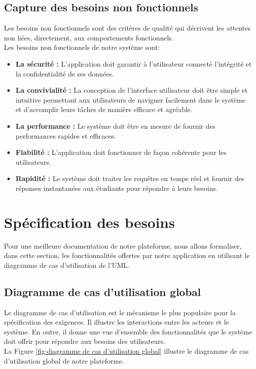 \subsection{Capture des besoins non fonctionnels}
Les besoins non fonctionnels sont des critères de qualité qui décrivent les attentes non liées, directement, aux  comportements fonctionnels.\\
Les besoins non fonctionnels de notre système sont:
\begin{itemize}[itemsep=1pt, parsep=1pt]
    \item \textbf{La sécurité : }L'application doit garantir à l'utilisateur connecté l'intégrité et la confidentialité de ses données.
    \item \textbf{La convivialité : }La conception de l’interface utilisateur doit être simple et intuitive permettant aux utilisateurs de naviguer facilement dans le système et d’accomplir leurs tâches de manière efficace et agréable.
    \item \textbf{La performance : }Le système doit être en mesure de fournir des performances rapides et efficaces.
    \item \textbf{Fiabilité : }L’application doit fonctionner de façon cohérente pour les utilisateurs.
    \item \textbf{Rapidité : }Le système doit traiter les requêtes en temps réel et fournir des réponses instantanées aux étudiants pour répondre à leurs besoins. 
\end{itemize}

\section{Spécification des besoins }
Pour une meilleure documentation de notre plateforme, nous allons formaliser, dans cette section, les fonctionnalités offertes par notre application en utilisant le diagramme de cas d'utilisation de l’UML.

\subsection{Diagramme de cas d’utilisation global}
Le diagramme de cas d'utilisation est le mécanisme le plus populaire pour la spécification des exigences. Il illustre les interactions entre les acteurs et le système. En outre, il donne une vue d'ensemble des fonctionnalités que le système doit offrir pour répondre aux besoins des utilisateurs.\\
La Figure \ref{fig:diagramme de cas d’utilisation global} illustre le diagramme de cas d’utilisation global de notre plateforme.


